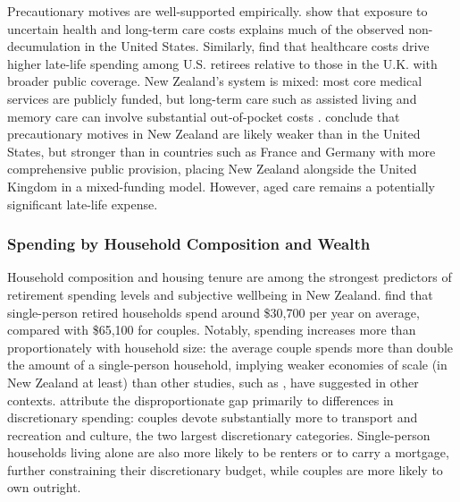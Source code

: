 \documentclass[11pt]{article}
\begin{document}
Precautionary motives are well-supported empirically. \textcite{denardi2010differential} show that exposure to uncertain health and long-term care costs explains much of the observed non-decumulation in the United States. Similarly, \textcite{banks2016lifeCycle} find that healthcare costs drive higher late-life spending among U.S. retirees relative to those in the U.K. with broader public coverage. New Zealand's system is mixed: most core medical services are publicly funded, but long-term care such as assisted living and memory care can involve substantial out-of-pocket costs \parencite{nzgov2026residentialCare}. \textcite{riig2024spending} conclude that precautionary motives in New Zealand are likely weaker than in the United States, but stronger than in countries such as France and Germany with more comprehensive public provision, placing New Zealand alongside the United Kingdom in a mixed-funding model. However, aged care remains a potentially significant late-life expense.

\subsubsection{Spending by Household Composition and Wealth}

Household composition and housing tenure are among the strongest predictors of retirement spending levels and subjective wellbeing in New Zealand. \textcite{le2023expenditure} find that single-person retired households spend around \$30,700 per year on average, compared with \$65,100 for couples. Notably, spending increases more than proportionately with household size: the average couple spends more than double the amount of a single-person household, implying weaker economies of scale (in New Zealand at least) than other studies, such as \parencite{anarkulova2025beyond}, have suggested in other contexts. \textcite{le2023expenditure} attribute the disproportionate gap primarily to differences in discretionary spending: couples devote substantially more to transport and recreation and culture, the two largest discretionary categories. Single-person households living alone are also more likely to be renters or to carry a mortgage, further constraining their discretionary budget, while couples are more likely to own outright.
\end{document}

